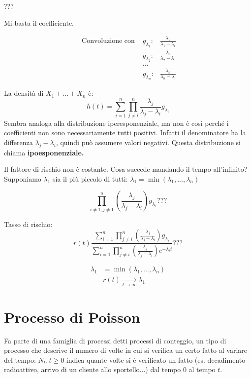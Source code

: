 \documentclass[a4paper,12pt]{book}
\begin{document}
??? %

Mi basta il coefficiente. 

$$ \begin{array}{ccc} %
 \text{ Convoluzione con } & g_{\lambda_1}: & \frac{\lambda_1}{\lambda_1 - \lambda_i} \\
 & g_{\lambda_2} : & \frac{\lambda_2}{\lambda_2  - \lambda_1} \\
 & ... & \\
 & g_{\lambda_n}: & \frac{\lambda_n}{\lambda_n - \lambda_i}
\end{array}$$


La densità di $ X_1 + ... + X_n $ è:
$$ h(t) = \sum_{i = 1}^n \prod_{j \ne i}^{n} \frac{\lambda_j}{\lambda_j - \lambda_i} g_{\lambda_i}$$
Sembra analoga alla distribuzione iperesponenziale, ma non è così perché i coefficienti non sono necessariamente tutti positivi. Infatti il denominatore ha la differenza $ \lambda_j - \lambda_i $, quindi può assumere valori negativi. Questa distribuzione si chiama \textbf{ipoesponenziale.} %

Il fattore di rischio non è costante. Cosa succede mandando il tempo all'infinito? Supponiamo $\lambda_1$ sia il più piccolo di tutti: $\lambda_1 = \min(\lambda_1, ..., \lambda_n)$

$$ \prod_{i \ne 1, j\ne 1}^{n} \left(\frac{\lambda_j}{\lambda_j - \lambda_i}\right) g_{\lambda_1} ??? $$ %

Tasso di rischio:
$$ r(t) \frac{\sum_{i=1}^{n}\prod_{j\ne i}^{n} \left(\frac{\lambda_j}{\lambda_j - \lambda_i}\right)g_{\lambda_i}}{\sum_{i=1}^{n}\prod_{j\ne i}^{n} \left(\frac{\lambda_j}{\lambda_j - \lambda_i}\right) e^{-\lambda_i t}} ??? $$%

\begin{align*}
	\lambda_1 & = \min(\lambda_1, ..., \lambda_n) \\
	& r(t) \underset{t \to \infty}{\longrightarrow} \lambda_1
\end{align*}

\chapter{Processo di Poisson}
Fa parte di una famiglia di processi detti processi di conteggio, un tipo di processo che descrive il numero di volte in cui si verifica un certo fatto al variare del tempo: $ N_t, t \ge 0 $ indica quante volte si è verificato un fatto (es. decadimento radioattivo, arrivo di un cliente allo sportello...) dal tempo 0 al tempo $ t $.
\end{document}
